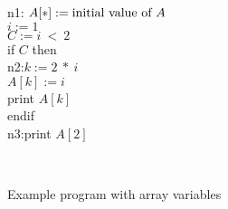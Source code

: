 

\begin{figure}%
\begin{center}
\parbox{3.0in}{
\begin{programa}
\mbox{n1:}
\Tb $A[*] := \mbox{\rm initial value of $A$}$\\
\Tb$i := 1$ \\
\Tb $C := i\ <\ 2 $\\
\Tb if $C$ then \\
\mbox{n2:}\Tc $k := 2\ *\ i$ \\
\Tc $A[k] := i$\\
\Tc print $A[k]$\\
\Tb endif \\
\mbox{n3:}\Tb print $A[2]$
\end{programa}
}\\
\end{center}
\caption{Example program with array variables}
\label{fig:ssa-acyclic-array}
\end{figure}


